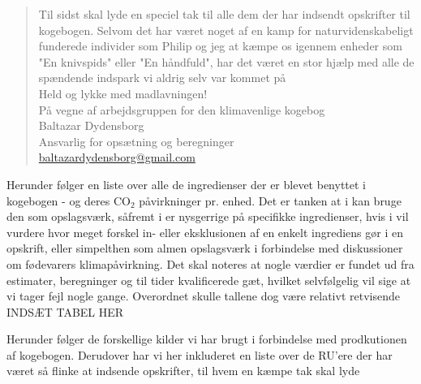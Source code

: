\documentclass[11pt, a4paper]{article}
\newcommand{\coo}{CO$_2$ }
\begin{document}
\begin{abstract}
\noindent Til sidst skal lyde en speciel tak til alle dem der har indsendt opskrifter til kogebogen. Selvom det har været noget af en kamp for naturvidenskabeligt funderede individer som Philip og jeg at kæmpe os igennem enheder som "En knivspids" eller "En håndfuld", har det været en stor hjælp med alle de spændende indspark vi aldrig selv var kommet på\\
	
\noindent	Held og lykke med madlavningen!\\
 På vegne af arbejdsgruppen for den klimavenlige kogebog\\
	Baltazar Dydensborg\\
	Ansvarlig for opsætning og beregninger\\
	\href{mailto:baltazardydensborg@gmail.com}{baltazardydensborg@gmail.com}
\end{abstract}
\newpage
\tableofcontents

\vspace{5em}
\newpage


	
\newpage


Herunder følger en liste over alle de ingredienser der er blevet benyttet i kogebogen - og deres \coo påvirkninger pr. enhed. Det er tanken at i kan bruge den som opslagsværk, såfremt i er nysgerrige på specifikke ingredienser, hvis i vil vurdere hvor meget forskel in- eller eksklusionen af en enkelt ingrediens gør i en opskrift, eller simpelthen som almen opslagsværk i forbindelse med diskussioner om fødevarers klimapåvirkning. Det skal noteres at nogle værdier er fundet ud fra estimater, beregninger og til tider kvalificerede gæt, hvilket selvfølgelig vil sige at vi tager fejl nogle gange. Overordnet skulle tallene dog være relativt retvisende\\

INDSÆT TABEL HER


Herunder følger de forskellige kilder vi har brugt i forbindelse med prodkutionen af kogebogen. Derudover har vi her inkluderet en liste over de RU'ere der har været så flinke at indsende opskrifter, til hvem en kæmpe tak skal lyde
\end{document}

